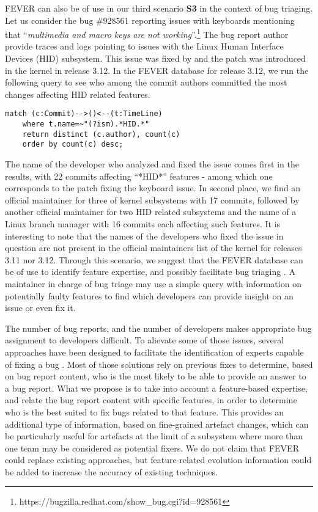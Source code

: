FEVER can also be of use in our third scenario \textbf{S3} in the context of bug triaging.
Let us consider the bug \#928561 reporting issues with keyboards mentioning that ``\textit{multimedia and macro keys are not working}''.\footnote{https://bugzilla.redhat.com/show\_bug.cgi?id=928561}
The bug report author provide traces and logs pointing to issues with the Linux Human Interface Devices (HID) subsystem.
This issue was fixed by and the patch was introduced in the  kernel in release 3.12.
In the FEVER database for release 3.12, we run the following query to see who among the commit authors committed
the most changes affecting HID related features.
\vspace{-.5ex}
\begin{verbatim}
match (c:Commit)-->()<--(t:TimeLine)
	where t.name=~"(?ism).*HID.*" 
	return distinct (c.author), count(c) 
	order by count(c) desc;
\end{verbatim}
\vspace{-.5ex}
The name of the developer who analyzed and fixed the issue comes first in the results, with 22 commits affecting ``*HID*'' features - 
among which one corresponds to the patch fixing  the keyboard issue.
In second place, we find an official maintainer for three of kernel subsystems with  17 commits, followed by another official maintainer 
for two HID related subsystems and the name of a Linux branch manager with 16 commits each affecting such features.
It is interesting to note that the names of the developers who fixed the issue in question 
are not present in the official maintainers list of the kernel for releases 3.11 nor 3.12. 
Through this scenario, we suggest that the FEVER database can be of use to identify feature expertise,
and possibly facilitate bug triaging \citep{matter_assigning_2009}.
A maintainer in charge of bug triage may use a simple query with information on potentially faulty features
to find which developers can provide insight on an issue or even fix it.

The number of bug reports, and the number of developers makes appropriate bug assignment to developers difficult.
To alievate some of those issues, several approaches have been designed to facilitate the identification of experts capable of fixing a bug \citep{ahsan_automatic_2009,matter_assigning_2009}.
Most of those solutions rely on previous fixes to determine, based on bug report content, who is the most likely to be able to provide an answer to a bug report.
What we propose is to take into account a feature-based expertise, and relate the bug report content with specific features, in order to determine
who is the best suited to fix bugs related to that feature.
This provides an additional type of information, based on fine-grained artefact changes, which can be particularly useful for artefacts at the limit 
of a subsystem where more than one team may be considered as potential fixers.
We do not claim that FEVER could replace existing approaches, but feature-related evolution information could be added to increase the accuracy
of existing techniques.

